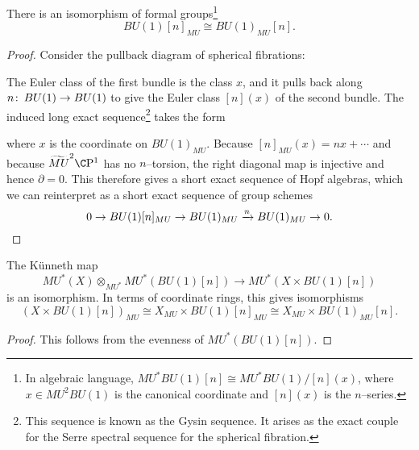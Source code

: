 \begin{lemma}\label{MUConvertsTorsionPointsToTorsionPoints}
There is an isomorphism of formal groups\footnote{In algebraic language, $MU^* BU(1)[n] \cong MU^* BU(1) / [n](x)$, where $x \in MU^2 BU(1)$ is the canonical coordinate and $[n](x)$ is the $n$--series.} \[BU(1)[n]_{MU} \cong BU(1)_{MU}[n].\]
\end{lemma}
\begin{proof}
Consider the pullback diagram of spherical fibrations:
\begin{center}
\end{center}
The Euler class of the first bundle is the class $x$, and it pulls back along $n\colon\thinspace BU(1) \to BU(1)$ to give the Euler class $[n](x)$ of the second bundle.  The induced long exact sequence\footnote{This sequence is known as the Gysin sequence.  It arises as the exact couple for the Serre spectral sequence for the spherical fibration.} takes the form
\begin{center}
\end{center}
where $x$ is the coordinate on $BU(1)_{MU}$.  Because $[n]_{MU}(x) = nx + \cdots$ and because $\widetilde{MU}^2 \CP^1$ has no $n$--torsion, the right diagonal map is injective and hence $\partial = 0$.  This therefore gives a short exact sequence of Hopf algebras, which we can reinterpret as a short exact sequence of group schemes \[0 \to BU(1)[n]_{MU} \to BU(1)_{MU} \xrightarrow{n} BU(1)_{MU} \to 0. \qedhere\]
\end{proof}

\begin{corollary}
The K\"unneth map \[MU^*(X) \otimes_{MU^*} MU^*(BU(1)[n]) \to MU^*(X \times BU(1)[n])\] is an isomorphism.  In terms of coordinate rings, this gives isomorphisms \[(X \times BU(1)[n])_{MU} \cong X_{MU} \times BU(1)[n]_{MU} \cong X_{MU} \times BU(1)_{MU}[n].\]
\end{corollary}
\begin{proof}
This follows from the evenness of $MU^*(BU(1)[n])$.
\end{proof}

